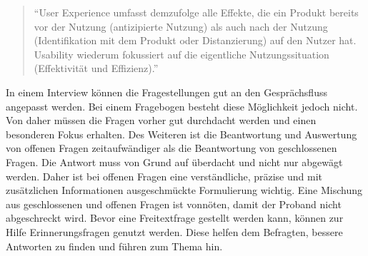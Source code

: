 \begin{quote}
	\enquote{User Experience umfasst demzufolge alle Effekte, die ein Produkt bereits vor der Nutzung (antizipierte Nutzung) als auch nach der Nutzung (Identifikation mit dem Produkt oder Distanzierung) auf den Nutzer hat. Usability wiederum fokussiert auf die eigentliche Nutzungssituation (Effektivität und Effizienz).}\autocite[Siehe][]{User}
\end{quote}

In einem Interview können die Fragestellungen gut an den Gesprächsfluss angepasst werden.
Bei einem Fragebogen besteht diese Möglichkeit jedoch nicht.
Von daher müssen die Fragen vorher gut durchdacht werden und einen besonderen Fokus erhalten.
Des Weiteren ist die Beantwortung und Auswertung von offenen Fragen zeitaufwändiger als die Beantwortung von geschlossenen Fragen.
Die Antwort muss von Grund auf überdacht und nicht nur abgewägt werden. 
Daher ist bei offenen Fragen eine verständliche, präzise und mit zusätzlichen Informationen ausgeschmückte Formulierung wichtig. 
Eine Mischung aus geschlossenen und offenen Fragen ist vonnöten, damit der Proband nicht abgeschreckt wird.
Bevor eine Freitextfrage gestellt werden kann, können zur Hilfe Erinnerungsfragen genutzt werden.
Diese helfen dem Befragten, bessere Antworten zu finden und führen zum Thema hin.\autocite[Vgl.][S. 35]{2009Fragebogen}
